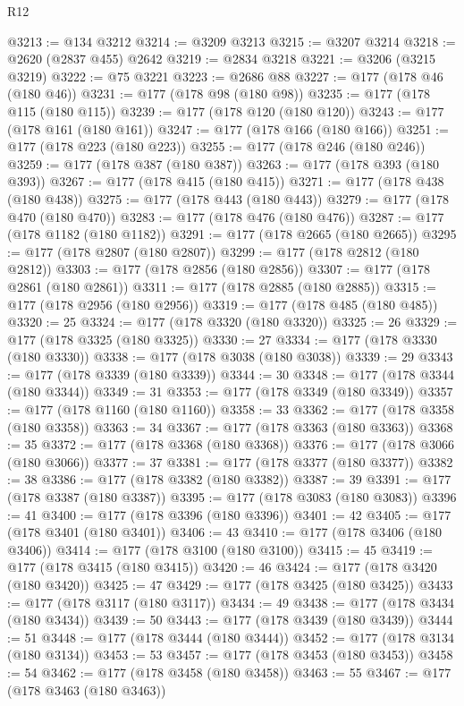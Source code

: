 \begin{lexlean}{R12}
\begin{coremodule}
{{{{{{{{{{{{{{{{{{{{{{{{{{{{{{{{{{{{{{{{{{{{{{{{{{{{{{{{{{{{{{{{{{{{{{{{{{{{{{{{{{@3213 := @134 @3212
@3214 := @3209 @3213
@3215 := @3207 @3214
@3218 := @2620 (@2837 @455) @2642
@3219 := @2834 @3218
@3221 := @3206 (@3215 @3219)
@3222 := @75 @3221
@3223 := @2686 @88
@3227 := @177 (@178 @46 (@180 @46))
@3231 := @177 (@178 @98 (@180 @98))
@3235 := @177 (@178 @115 (@180 @115))
@3239 := @177 (@178 @120 (@180 @120))
@3243 := @177 (@178 @161 (@180 @161))
@3247 := @177 (@178 @166 (@180 @166))
@3251 := @177 (@178 @223 (@180 @223))
@3255 := @177 (@178 @246 (@180 @246))
@3259 := @177 (@178 @387 (@180 @387))
@3263 := @177 (@178 @393 (@180 @393))
@3267 := @177 (@178 @415 (@180 @415))
@3271 := @177 (@178 @438 (@180 @438))
@3275 := @177 (@178 @443 (@180 @443))
@3279 := @177 (@178 @470 (@180 @470))
@3283 := @177 (@178 @476 (@180 @476))
@3287 := @177 (@178 @1182 (@180 @1182))
@3291 := @177 (@178 @2665 (@180 @2665))
@3295 := @177 (@178 @2807 (@180 @2807))
@3299 := @177 (@178 @2812 (@180 @2812))
@3303 := @177 (@178 @2856 (@180 @2856))
@3307 := @177 (@178 @2861 (@180 @2861))
@3311 := @177 (@178 @2885 (@180 @2885))
@3315 := @177 (@178 @2956 (@180 @2956))
@3319 := @177 (@178 @485 (@180 @485))
@3320 := 25
@3324 := @177 (@178 @3320 (@180 @3320))
@3325 := 26
@3329 := @177 (@178 @3325 (@180 @3325))
@3330 := 27
@3334 := @177 (@178 @3330 (@180 @3330))
@3338 := @177 (@178 @3038 (@180 @3038))
@3339 := 29
@3343 := @177 (@178 @3339 (@180 @3339))
@3344 := 30
@3348 := @177 (@178 @3344 (@180 @3344))
@3349 := 31
@3353 := @177 (@178 @3349 (@180 @3349))
@3357 := @177 (@178 @1160 (@180 @1160))
@3358 := 33
@3362 := @177 (@178 @3358 (@180 @3358))
@3363 := 34
@3367 := @177 (@178 @3363 (@180 @3363))
@3368 := 35
@3372 := @177 (@178 @3368 (@180 @3368))
@3376 := @177 (@178 @3066 (@180 @3066))
@3377 := 37
@3381 := @177 (@178 @3377 (@180 @3377))
@3382 := 38
@3386 := @177 (@178 @3382 (@180 @3382))
@3387 := 39
@3391 := @177 (@178 @3387 (@180 @3387))
@3395 := @177 (@178 @3083 (@180 @3083))
@3396 := 41
@3400 := @177 (@178 @3396 (@180 @3396))
@3401 := 42
@3405 := @177 (@178 @3401 (@180 @3401))
@3406 := 43
@3410 := @177 (@178 @3406 (@180 @3406))
@3414 := @177 (@178 @3100 (@180 @3100))
@3415 := 45
@3419 := @177 (@178 @3415 (@180 @3415))
@3420 := 46
@3424 := @177 (@178 @3420 (@180 @3420))
@3425 := 47
@3429 := @177 (@178 @3425 (@180 @3425))
@3433 := @177 (@178 @3117 (@180 @3117))
@3434 := 49
@3438 := @177 (@178 @3434 (@180 @3434))
@3439 := 50
@3443 := @177 (@178 @3439 (@180 @3439))
@3444 := 51
@3448 := @177 (@178 @3444 (@180 @3444))
@3452 := @177 (@178 @3134 (@180 @3134))
@3453 := 53
@3457 := @177 (@178 @3453 (@180 @3453))
@3458 := 54
@3462 := @177 (@178 @3458 (@180 @3458))
@3463 := 55
@3467 := @177 (@178 @3463 (@180 @3463))
}}}}}}}}}}}}}}}}}}}}}}}}}}}}}}}}}}}}}}}}}}}}}}}}}}}}}}}}}}}}}}}}}}}}}}}}}}}}}}}}}}
\end{coremodule}
\end{lexlean}
